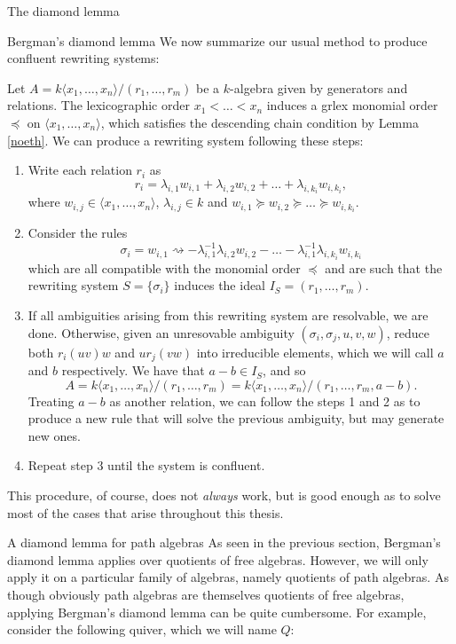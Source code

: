 \begin{chapter}{The diamond lemma}
\begin{section}{Bergman's diamond lemma}
We now summarize our usual method to produce confluent rewriting systems:

\begin{heur} Let $A=k\langle x_1,\dots,x_n\rangle/(r_1,\dots,r_m)$ be a $k$-algebra given by generators and relations. The lexicographic order $x_1<\dots<x_n$ induces a grlex monomial order $\preceq$ on $\langle x_1,\dots,x_n\rangle$, which satisfies the descending chain condition by Lemma \ref{noeth}. We can produce a rewriting system following these steps:
\begin{enumerate}
\item Write each relation $r_i$ as
\[r_i = \lambda_{i,1}w_{i,1} + \lambda_{i,2} w_{i,2} + \dots + \lambda_{i,k_i} w_{i, k_i},\]
where $w_{i,j}\in \langle x_1,\dots,x_n\rangle$, $\lambda_{i,j}\in k$ and $w_{i,1}\succeq w_{i,2}\succeq\dots\succeq w_{i,k_i}$.
\item Consider the rules
\[\sigma_i = w_{i,1} \rightsquigarrow -\lambda_{i,1}^{-1}\lambda_{i,2}w_{i,2}-\dots-\lambda_{i,1}^{-1}\lambda_{i,k_i}w_{i,k_i}\]
which are all compatible with the monomial order $\preceq$ and are such that the rewriting system $S=\{\sigma_i\}$ induces the ideal $I_S=(r_1,\dots,r_m)$.
\item If all ambiguities arising from this rewriting system are resolvable, we are done. Otherwise, given an unresovable ambiguity $(\sigma_i, \sigma_j, u,v,w)$, reduce both $r_i(uv)w$ and $ur_j(vw)$ into irreducible elements, which we will call $a$ and $b$ respectively. We have that $a-b\in I_S$, and so \[A=k\langle x_1,\dots,x_n\rangle/(r_1,\dots,r_m)=k\langle x_1,\dots,x_n\rangle/(r_1,\dots,r_m, a-b).\]
Treating $a-b$ as another relation, we can follow the steps 1 and 2 as to produce a new rule that will solve the previous ambiguity, but may generate new ones.
\item Repeat step 3 until the system is confluent.
\end{enumerate}
This procedure, of course, does not \emph{always} work, but is good enough as to solve most of the cases that arise throughout this thesis.
\end{heur}
\end{section}
\begin{section}{A diamond lemma for path algebras}
As seen in the previous section, Bergman's diamond lemma applies over quotients of free algebras. However, we will only apply it on a particular family of algebras, namely quotients of path algebras. As though obviously path algebras are themselves quotients of free algebras, applying Bergman's diamond lemma can be quite cumbersome. For example, consider the following quiver, which we will name $Q$:

\end{section}
\end{chapter}
